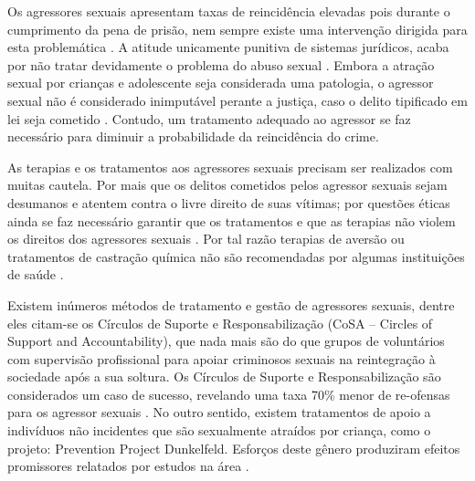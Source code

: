 
Os agressores sexuais apresentam taxas de reincidência elevadas pois durante o cumprimento da pena de prisão, nem sempre existe uma intervenção dirigida para esta problemática \cite{ribeiro2018programas, finkelhor2009prevention, maia2014castraccao}. A atitude unicamente punitiva de sistemas jurídicos, acaba por não tratar devidamente o problema do abuso sexual \cite{Camila2019}. Embora a atração sexual por crianças e adolescente seja considerada uma patologia, o agressor sexual não é considerado inimputável perante a justiça, caso o delito tipificado em lei seja cometido \cite{ribeiro2018programas}. Contudo, um tratamento adequado ao agressor se faz necessário para diminuir a probabilidade da reincidência do crime. 

As terapias e os tratamentos aos agressores sexuais precisam ser realizados com muitas cautela. Por mais que os delitos cometidos pelos agressor sexuais sejam desumanos e atentem contra o livre direito de suas vítimas; por questões éticas ainda se faz necessário garantir que os tratamentos e que as terapias não violem os direitos dos agressores sexuais \cite{finkelhor2009prevention}. Por tal razão terapias de aversão ou tratamentos de castração química não são recomendadas por algumas instituições de saúde \cite{maia2014castraccao}.




Existem inúmeros métodos de tratamento e gestão de agressores sexuais, dentre eles citam-se os Círculos de Suporte e Responsabilização (CoSA – Circles of Support and Accountability), que nada mais são do que grupos de voluntários com supervisão profissional para apoiar criminosos sexuais na reintegração à sociedade após a sua soltura. Os Círculos de Suporte e Responsabilização são considerados um caso de sucesso, revelando uma taxa 70\% menor de re-ofensas para os agressor sexuais \cite{finkelhor2009prevention}. No outro sentido, existem tratamentos de apoio a indivíduos não incidentes que são sexualmente atraídos por criança, como o projeto: Prevention Project Dunkelfeld. Esforços deste gênero produziram efeitos promissores relatados por estudos na área \cite{mendelson2015parent}.


